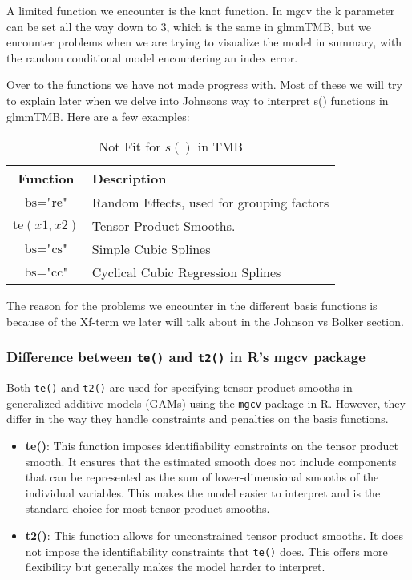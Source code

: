 A limited function we encounter is the knot function. In mgcv the k parameter can be set all the way down to 3, which is the same in glmmTMB, but we encounter problems when we are trying to visualize the model in summary, with the random conditional model encountering an index error.






\newline
Over to the functions we have not made progress with. Most of these we will try to explain later when we delve into Johnsons way to interpret s() functions in glmmTMB. Here are a few examples:

\begin{table}[h]
    \centering
    \caption{Not Fit for \( s() \) in TMB}
    \label{tab:NotFitForTMB}
    \begin{tabularx}{\textwidth}{|c|X|}
        \hline
        Function & Description \\
        \hline
        \( \text{bs} = \text{"re"} \) & Random Effects, used for grouping factors \\
        \hline
        \( \text{te}(x1, x2) \) &   Tensor Product Smooths. \\
        \hline
        \( \text{bs} = \text{"cs"} \) &  Simple Cubic Splines  \\
        \hline
        \( \text{bs} = \text{"cc"} \) &  Cyclical Cubic Regression Splines \\
        \hline
    \end{tabularx}
\end{table}

The reason for the problems we encounter in the different basis functions is because of the Xf-term we later will talk about in the Johnson vs Bolker section.


\subsubsection{Difference between \texttt{te()} and \texttt{t2()} in R's mgcv package}

Both \texttt{te()} and \texttt{t2()} are used for specifying tensor product smooths in generalized additive models (GAMs) using the \texttt{mgcv} package in R. However, they differ in the way they handle constraints and penalties on the basis functions.

\begin{itemize}
    \item \textbf{te()}: This function imposes identifiability constraints on the tensor product smooth. It ensures that the estimated smooth does not include components that can be represented as the sum of lower-dimensional smooths of the individual variables. This makes the model easier to interpret and is the standard choice for most tensor product smooths.
    
    \item \textbf{t2()}: This function allows for unconstrained tensor product smooths. It does not impose the identifiability constraints that \texttt{te()} does. This offers more flexibility but generally makes the model harder to interpret.
\end{itemize}


